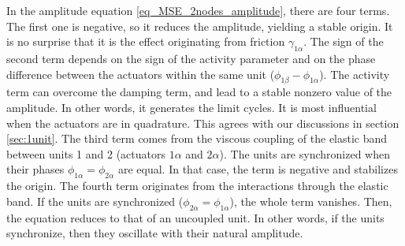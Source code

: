\documentclass[11pt, a4paper]{article} %
\begin{document}
In the amplitude equation \eqref{eq_MSE_2nodes_amplitude}, there are four terms. The first one is negative, 
so it reduces the amplitude, yielding a stable origin. It is no surprise that it is the effect originating from friction $\gamma_{1\alpha}$. 
The sign of the second term depends on the sign of the activity parameter and on the phase difference between the actuators within the same unit 
($\phi_{1\beta} - \phi_{1\alpha}$). The activity term can overcome the damping term, and lead to a stable nonzero value of the amplitude. 
In other words, it generates the limit cycles. It is most influential when the actuators are in quadrature. This agrees with our discussions in section \ref{sec:1unit}.
The third term comes from the viscous coupling of the elastic band between units 1 and 2 (actuators $1\alpha$ and $2\alpha$). 
The units are synchronized when their phases $\phi_{1\alpha} = \phi_{2\alpha}$ are equal. In that case, the term is negative and stabilizes the origin. 
The fourth term originates from the interactions through the elastic band. If the units are synchronized ($\phi_{2\alpha}=\phi_{1\alpha}$), 
the whole term vanishes. Then, the equation reduces to that of an uncoupled unit. In other words, 
if the units synchronize, then they oscillate with their natural amplitude.  
\end{document}
